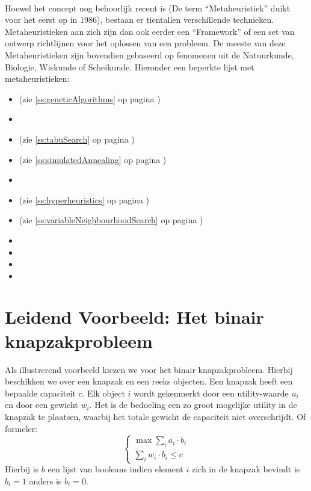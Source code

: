 \paragraph{}Hoewel het concept nog behoorlijk recent is (De term ``Metaheuristiek'' duikt voor het eerst op in 1986), bestaan er tientallen verschillende technieken. Metaheuristieken aan zich zijn dan ook eerder een ``Framework'' of een set van ontwerp richtlijnen voor het oplossen van een probleem. De meeste van deze Metaheuristieken zijn bovendien gebaseerd op fenomenen uit de Natuurkunde, Biologie, Wiskunde of Scheikunde. Hieronder een beperkte lijst met metaheuristieken:
\begin{multicols}{2}
\begin{itemize}
 \item {} (zie \ref{ss:geneticAlgorithms} op pagina \pageref{ss:geneticAlgorithms})
 \item {}
 \item {} (zie \ref{ss:tabuSearch} op pagina \pageref{ss:tabuSearch})
 \item {} (zie \ref{ss:simulatedAnnealing} op pagina \pageref{ss:simulatedAnnealing})
 \item {}
 \item {} (zie \ref{ss:hyperheuristics} op pagina \pageref{ss:hyperheuristics})
 \item {} (zie \ref{ss:variableNeighbourhoodSearch} op pagina \pageref{ss:variableNeighbourhoodSearch})
 \item {}
 \item {}
 \item {}
 \item {}
\end{itemize}
\end{multicols}
\section{Leidend Voorbeeld: Het binair knapzakprobleem}
\begin{leftbar}
Als illustrerend voorbeeld kiezen we voor het binair knapzakprobleem. Hierbij beschikken we over een knapzak en een reeks objecten. Een knapzak heeft een bepaalde capaciteit $c$. Elk object $i$ wordt gekenmerkt door een utility-waarde $u_i$ en door een gewicht $w_i$. Het is de bedoeling een zo groot mogelijke utility in de knapzak te plaatsen, waarbij het totale gewicht de capaciteit niet overschrijdt. Of formeler:
\begin{equation}
\left\{\begin{array}{l}
\max\displaystyle\sum_i{a_i\cdot b_i}\\
\displaystyle\sum_i{w_i\cdot b_i}\leq c
\end{array}\right.
\end{equation}
Hierbij is $b$ een lijst van booleans indien element $i$ zich in de knapzak bevindt is $b_i=1$ anders is $b_i=0$.
\end{leftbar}
